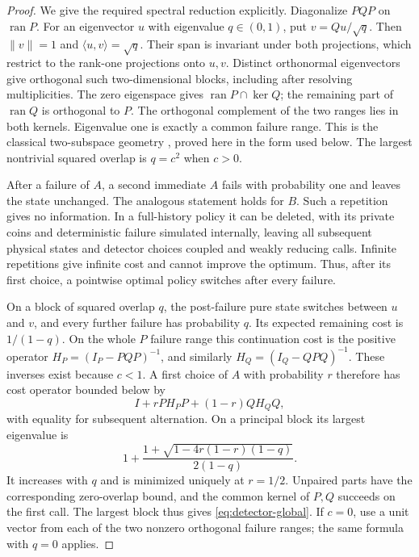 \begin{proof}
We give the required spectral reduction explicitly. Diagonalize $PQP$ on $\operatorname{ran}P$. For an eigenvector $u$ with eigenvalue $q\in(0,1)$, put $v=Qu/\sqrt q$. Then $\|v\|=1$ and $\langle u,v\rangle=\sqrt q$. Their span is invariant under both projections, which restrict to the rank-one projections onto $u,v$. Distinct orthonormal eigenvectors give orthogonal such two-dimensional blocks, including after resolving multiplicities. The zero eigenspace gives $\operatorname{ran}P\cap\ker Q$; the remaining part of $\operatorname{ran}Q$ is orthogonal to $P$. The orthogonal complement of the two ranges lies in both kernels. Eigenvalue one is exactly a common failure range. This is the classical two-subspace geometry \cite{Halmos69}, proved here in the form used below. The largest nontrivial squared overlap is $q=c^2$ when $c>0$.

After a failure of $A$, a second immediate $A$ fails with probability one and leaves the state unchanged. The analogous statement holds for $B$. Such a repetition gives no information. In a full-history policy it can be deleted, with its private coins and deterministic failure simulated internally, leaving all subsequent physical states and detector choices coupled and weakly reducing calls. Infinite repetitions give infinite cost and cannot improve the optimum. Thus, after its first choice, a pointwise optimal policy switches after every failure.

On a block of squared overlap $q$, the post-failure pure state switches between $u$ and $v$, and every further failure has probability $q$. Its expected remaining cost is $1/(1-q)$. On the whole $P$ failure range this continuation cost is the positive operator $H_P=(I_P-PQP)^{-1}$, and similarly $H_Q=(I_Q-QPQ)^{-1}$. These inverses exist because $c<1$. A first choice of $A$ with probability $r$ therefore has cost operator bounded below by
\begin{equation}\label{eq:detector-lower-operator}
 I+rPH_PP+(1-r)QH_QQ,
\end{equation}
with equality for subsequent alternation. On a principal block its largest eigenvalue is
\begin{equation}\label{eq:detector-block}
 1+\frac{1+\sqrt{1-4r(1-r)(1-q)}}{2(1-q)}.
\end{equation}
It increases with $q$ and is minimized uniquely at $r=1/2$. Unpaired parts have the corresponding zero-overlap bound, and the common kernel of $P,Q$ succeeds on the first call. The largest block thus gives \eqref{eq:detector-global}. If $c=0$, use a unit vector from each of the two nonzero orthogonal failure ranges; the same formula with $q=0$ applies.


\end{proof}
